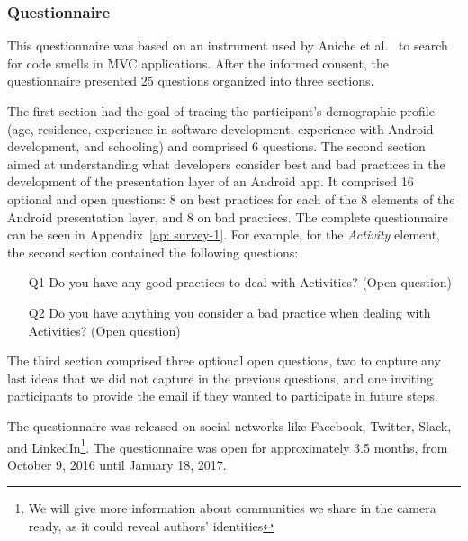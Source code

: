 \subsubsection{Questionnaire}
\label{etapa-1-questionario}

This questionnaire was based on an instrument used by Aniche et al.~\cite{AnicheSmellsMVC:17, FinavaroAniche2016} to search for code smells in \acs{MVC} applications. 
After the informed consent, the questionnaire presented 25  questions organized into three sections.

The first section had the goal of tracing the participant's demographic profile (age, residence, experience in software development, experience with Android development, and schooling) and comprised 6 questions. The second section aimed at understanding what developers consider best and bad practices in the development of the presentation layer of an Android app. It comprised 16 optional and open questions: 8 on best practices for each of the 8 elements of the Android presentation layer, and 8 on bad practices. The complete questionnaire can be seen in Appendix~\ref{ap: survey-1}. 
For example, for the \textit{Activity} element, the second section contained the following questions:

\begin{itemize}
  \item[Q1] Do you have any good practices to deal with Activities? (Open question)
  \item[Q2] Do you have anything you consider a bad practice when dealing with Activities? (Open question)
\end{itemize}

The third section comprised three optional open questions, 
two to capture any last ideas that we did not capture in the previous questions, and one inviting participants to provide the email if they wanted to participate in future steps.


The questionnaire was released on social networks like Facebook, Twitter, Slack, and LinkedIn\footnote{We will give more information about communities we share in the camera ready, as it could reveal authors' identities}. The questionnaire was open for approximately 3.5 months, from October 9, 2016 until January 18, 2017.

